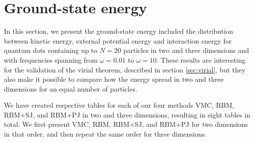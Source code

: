 \section{Ground-state energy} \label{sec:energydistribution}
In this section, we present the ground-state energy included the distribution between kinetic energy, external potential energy and interaction energy for quantum dots containing up to $N=20$ particles in two and three dimensions and with frequencies spanning from $\omega=0.01$ to $\omega=10$. These results are interesting for the validation of the virial theorem, described in section \ref{sec:virial}, but they also make it possible to compare how the energy spread in two and three dimensions for an equal number of particles.

We have created respective tables for each of our four methods VMC, RBM, RBM+SJ, and RBM+PJ in two and three dimensions, resulting in eight tables in total. We first present VMC, RBM, RBM+SJ, and RBM+PJ for two dimensions in that order, and then repeat the same order for three dimensions. 

\cleardoublepage
